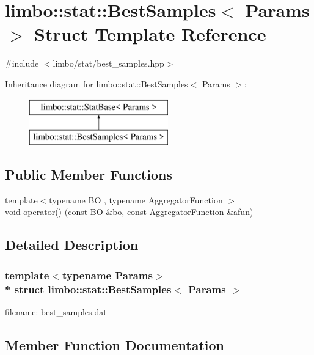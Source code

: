 \hypertarget{structlimbo_1_1stat_1_1_best_samples}{}\section{limbo\+:\+:stat\+:\+:Best\+Samples$<$ Params $>$ Struct Template Reference}
\label{structlimbo_1_1stat_1_1_best_samples}


{\ttfamily \#include $<$limbo/stat/best\+\_\+samples.\+hpp$>$}

Inheritance diagram for limbo\+:\+:stat\+:\+:Best\+Samples$<$ Params $>$\+:\begin{figure}[H]
\begin{center}
\leavevmode
\includegraphics[height=2.000000cm]{structlimbo_1_1stat_1_1_best_samples}
\end{center}
\end{figure}
\subsection*{Public Member Functions}
\begin{DoxyCompactItemize}
\item 
{\footnotesize template$<$typename BO , typename Aggregator\+Function $>$ }\\void \hyperlink{structlimbo_1_1stat_1_1_best_samples_a432216d8c0eaeca98226e500c304e5fa}{operator()} (const BO \&bo, const Aggregator\+Function \&afun)
\end{DoxyCompactItemize}


\subsection{Detailed Description}
\subsubsection*{template$<$typename Params$>$\\*
struct limbo\+::stat\+::\+Best\+Samples$<$ Params $>$}

filename\+: {\ttfamily best\+\_\+samples.\+dat} 

\subsection{Member Function Documentation}
